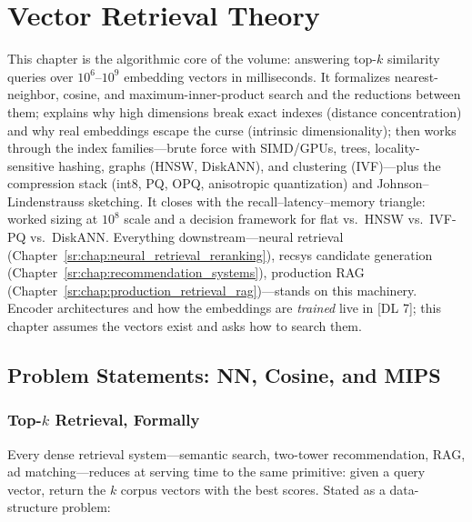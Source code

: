 \chapter{Vector Retrieval Theory}
\label{sr:chap:vector_retrieval_theory}

\begin{tldr}
This chapter is the algorithmic core of the volume: answering top-$k$ similarity queries over $10^6$--$10^9$ embedding vectors in milliseconds. It formalizes nearest-neighbor, cosine, and maximum-inner-product search and the reductions between them; explains why high dimensions break exact indexes (distance concentration) and why real embeddings escape the curse (intrinsic dimensionality); then works through the index families---brute force with SIMD/GPUs, trees, locality-sensitive hashing, graphs (HNSW, DiskANN), and clustering (IVF)---plus the compression stack (int8, PQ, OPQ, anisotropic quantization) and Johnson--Lindenstrauss sketching. It closes with the recall--latency--memory triangle: worked sizing at $10^8$ scale and a decision framework for flat vs.\ HNSW vs.\ IVF-PQ vs.\ DiskANN. Everything downstream---neural retrieval (Chapter~\ref{sr:chap:neural_retrieval_reranking}), recsys candidate generation (Chapter~\ref{sr:chap:recommendation_systems}), production RAG (Chapter~\ref{sr:chap:production_retrieval_rag})---stands on this machinery. Encoder architectures and how the embeddings are \emph{trained} live in [DL 7]; this chapter assumes the vectors exist and asks how to search them.
\end{tldr}

\section{Problem Statements: NN, Cosine, and MIPS}
\label{sr:sec:vr_problem}

\subsection{Top-$k$ Retrieval, Formally}

Every dense retrieval system---semantic search, two-tower recommendation, RAG, ad matching---reduces at serving time to the same primitive: given a query vector, return the $k$ corpus vectors with the best scores. Stated as a data-structure problem:

